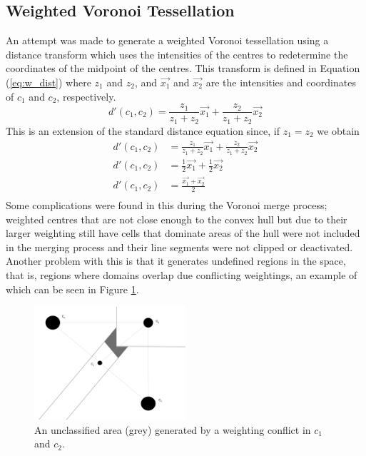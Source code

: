 \subsection{Weighted Voronoi Tessellation}
An attempt was made to generate a weighted Voronoi tessellation using a distance transform which uses the intensities of the centres to redetermine the coordinates of the midpoint of the centres. This transform is defined in Equation (\ref{eq:w_dist}) where $z_1$ and $z_2$, and $\vec{x_1}$ and $\vec{x_2}$ are the intensities and coordinates of $c_1$ and $c_2$, respectively.
\begin{equation}\label{eq:w_dist}
	d'(c_1,c_2) = \frac{z_1}{z_1+z_2}\vec{x_1} + \frac{z_2}{z_1+z_2}\vec{x_2}
\end{equation}
This is an extension of the standard distance equation since, if $z_1=z_2$ we obtain
\begin{align*}
	d'(c_1,c_2) &= \frac{z_1}{z_1+z_2}\vec{x_1} + \frac{z_2}{z_1+z_2}\vec{x_2} \\
	d'(c_1,c_2) &= \frac{1}{2}\vec{x_1} + \frac{1}{2}\vec{x_2} \\ 
	d'(c_1,c_2) &= \frac{\vec{x_1} + \vec{x_2}}{2} \\
\end{align*}
Some complications were found in this during the Voronoi merge process; weighted centres that are not close enough to the convex hull but due to their larger weighting still have cells that dominate areas of the hull were not included in the merging process and their line segments were not clipped or deactivated. Another problem with this is that it generates undefined regions in the space, that is, regions where domains overlap due conflicting weightings, an example of which can be seen in Figure \ref{fig:w_voronoi_issue}.
\begin{figure}[H]
\includegraphics[width=0.5\textwidth]{Images/weighting_problem.png}
\centering
\caption{An unclassified area (grey) generated by a weighting conflict in $c_1$ and $c_2$.}
\label{fig:w_voronoi_issue}
\end{figure}
